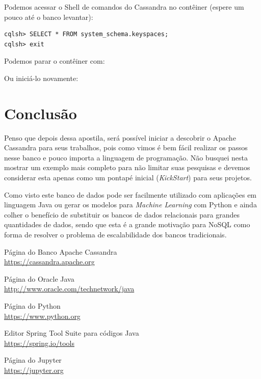 \documentclass[a4paper,11pt]{article}
\begin{document}
Podemos acessar o Shell de comandos do Cassandra no contêiner (espere um pouco até o banco levantar): \\
\begin{lstlisting}[]
cqlsh> SELECT * FROM system_schema.keyspaces;
cqlsh> exit
\end{lstlisting}

Podemos parar o contêiner com: \\

Ou iniciá-lo novamente: \\





\section{Conclusão}
Penso que depois dessa apostila, será possível iniciar a descobrir o Apache Cassandra para seus trabalhos, pois como vimos é bem fácil realizar os passos nesse banco e pouco importa a linguagem de programação. Não busquei nesta mostrar um exemplo mais completo para não limitar suas pesquisas e devemos considerar esta apenas como um pontapé inicial (\textit{KickStart}) para seus projetos.

Como visto este banco de dados pode ser facilmente utilizado com aplicações em linguagem Java ou gerar os modelos para \textit{Machine Learning} com Python e ainda colher o benefício de substituir os bancos de dados relacionais para grandes quantidades de dados, sendo que esta é a grande motivação para NoSQL como forma de resolver o problema de escalabilidade dos bancos tradicionais.




\begin{thebibliography}{8}
  Página do Banco Apache Cassandra \\
  \url{https://cassandra.apache.org}

  Página do Oracle Java \\
  \url{http://www.oracle.com/technetwork/java}
  
  Página do Python \\
  \url{https://www.python.org}

  Editor Spring Tool Suite para códigos Java \\
  \url{https://spring.io/tools}

  Página do Jupyter \\
  \url{https://jupyter.org}

  
\end{thebibliography}
  
\end{document}
